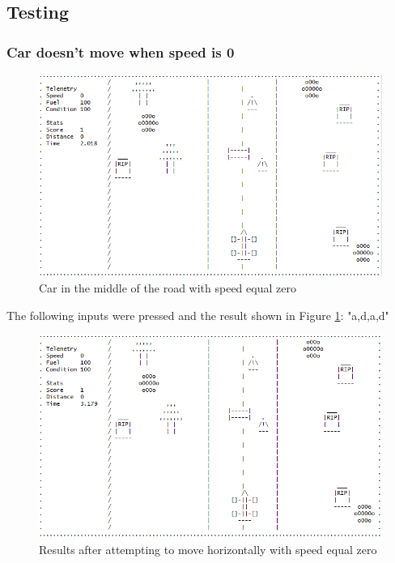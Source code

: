 \documentclass{article}
\begin{document}
\subsection*{Testing}
\subsubsection*{Car doesn't move when speed is 0}
\begin{figure}[!ht]
	\begin{center}
	\includegraphics[width=0.667\paperwidth]{images/car_test_nospeed}
	\caption{Car in the middle of the road with speed equal zero}
	\label{fig:car_test_nospeed} 
	\end{center}
\end{figure}
The following inputs were pressed and the result shown in Figure \ref{fig:car_test_nospeed}: "a,d,a,d"
\begin{figure}[!ht]
	\begin{center}
	\includegraphics[width=0.667\paperwidth]{images/car_test_nospeed2}
	\caption{Results after attempting to move horizontally with speed equal zero}
	\label{fig:car_test_nospeed2} 
	\end{center}
\end{figure}
\end{document}
